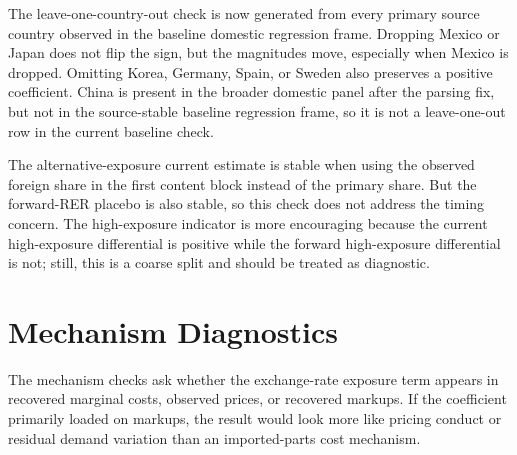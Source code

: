 \documentclass[11pt]{article}
\newcommand{\CurrentTableNote}{}
\newcommand{\settablefootnote}[1]{\renewcommand{\CurrentTableNote}{#1}}
\begin{document}
The leave-one-country-out check is now generated from every primary source country observed in the baseline domestic regression frame. Dropping Mexico or Japan does not flip the sign, but the magnitudes move, especially when Mexico is dropped. Omitting Korea, Germany, Spain, or Sweden also preserves a positive coefficient. China is present in the broader domestic panel after the parsing fix, but not in the source-stable baseline regression frame, so it is not a leave-one-out row in the current baseline check.

\settablefootnote{Alternative-exposure regressions are first-difference specifications using the baseline domestic sample and year fixed effects. ``Observed foreign share in first content block'' is the lagged sum of \texttt{pcOth1\_pct1} and \texttt{pcOth1\_pct2}; it is not the full foreign-content share from all raw content fields.}

\settablefootnote{}

The alternative-exposure current estimate is stable when using the observed foreign share in the first content block instead of the primary share. But the forward-RER placebo is also stable, so this check does not address the timing concern. The high-exposure indicator is more encouraging because the current high-exposure differential is positive while the forward high-exposure differential is not; still, this is a coarse split and should be treated as diagnostic.

\section{Mechanism Diagnostics}

The mechanism checks ask whether the exchange-rate exposure term appears in recovered marginal costs, observed prices, or recovered markups. If the coefficient primarily loaded on markups, the result would look more like pricing conduct or residual demand variation than an imported-parts cost mechanism.

\settablefootnote{Each cell re-estimates the same exposure-weighted exchange-rate specification with the outcome shown in the row. Current columns use the contemporaneous exchange-rate term; forward columns use the one-year-ahead term. Levels regressions include make-model and year fixed effects and controls; first-difference regressions include year fixed effects and differenced controls. Standard errors are clustered by make-model.}

\settablefootnote{}
\end{document}
